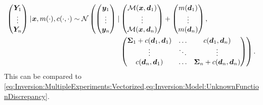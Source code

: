 \begin{equation} \label{eq:Inversion:Model:RandomFunctionDiscrepancy}
  \begin{aligned}
    \begin{pmatrix}
      \bm{Y}_1 \\
      \vdots \\
      \bm{Y}_n \\
    \end{pmatrix} \cond \bm{x},m(\cdot),c(\cdot,\cdot) \sim \mathcal{N}
    \left( \vphantom{\begin{pmatrix} \bm{y}_1 \\ \vdots \\ \bm{y}_n \end{pmatrix}} \!\! \right.
    \begin{pmatrix}
      \bm{y}_1 \\
      \vdots \\
      \bm{y}_n \\
    \end{pmatrix}
    \cond
    &\begin{pmatrix}
      \mathcal{M}(\bm{x},\bm{d}_1) \\
      \vdots \\
      \mathcal{M}(\bm{x},\bm{d}_n) \\
    \end{pmatrix}
    +
    \begin{pmatrix}
      m(\bm{d}_1)\\
      \vdots \\
      m(\bm{d}_n) \\
    \end{pmatrix}
    , \\
    &\begin{pmatrix}
      \bm{\Sigma}_1 + c(\bm{d}_1,\bm{d}_1) & \ldots & c(\bm{d}_1,\bm{d}_n) \\
      \vdots & \ddots & \vdots \\
       c(\bm{d}_n,\bm{d}_1) & \ldots & \bm{\Sigma}_n + c(\bm{d}_n,\bm{d}_n) \\
    \end{pmatrix}
    \left. \vphantom{\begin{pmatrix} \bm{y}_1 \\ \vdots \\ \bm{y}_n \end{pmatrix}} \!\! \right).
  \end{aligned}
\end{equation}
This can be compared to \cref{eq:Inversion:MultipleExperiments:Vectorized,eq:Inversion:Model:UnknownFunctionDiscrepancy}.
